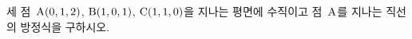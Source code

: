 세 점~$\mathrm{A}(0{,}\mkern3mu\mathopen{}1{,}\mkern3mu\mathopen{}2)$, $\mathrm{B}(1{,}\mkern3mu\mathopen{}0{,}\mkern3mu\mathopen{}1)$, $\mathrm{C}(1{,}\mkern3mu\mathopen{}1{,}\mkern3mu\mathopen{}0)$을 지나는 평면에 수직이고 점~$\mathrm{A}$를 지나는 직선의 방정식을 구하시오.
